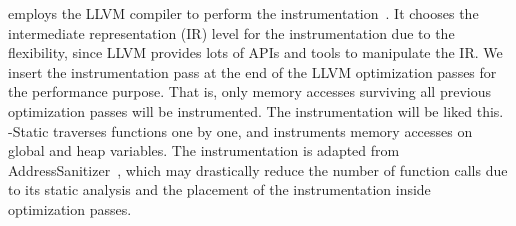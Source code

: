 \NP{} employs the LLVM compiler to perform the instrumentation~\cite{llvm}. It chooses the intermediate  representation (IR) level for the instrumentation due to the flexibility, since LLVM provides lots of APIs and tools to manipulate the IR. We insert the instrumentation pass at the end of the LLVM optimization passes for the performance purpose. That is, only memory accesses surviving all previous optimization passes will be instrumented.  The instrumentation will be liked this. \NP{}-Static traverses functions one by one, and instruments memory accesses on global and heap variables. The instrumentation is adapted from AddressSanitizer~\cite{AddressSanitizer}, which may drastically reduce the  number  of  function  calls due to its static analysis and the placement of the instrumentation inside optimization passes. 

\begin{comment}

To intercept memory access instructions, The function call is implemented by \NP{}, through which \NP{} could intercept each memory access operation from target applications with its address and access type(read or write).

It is worth to note that \NP{} only focused on memory access to heap objects and global objects, since they have much higher chance to be shared for multiple threads, which leads potential NUMA issues. If an object is only accessed by one single thread, it will never cause performance issues, unless threads migrated to another nodes and \NP{} could also detect this problem that is detailed described in the following parts.Besides, the pass function should be placed at the very end of compiling optimization phase of LLVM, since most memory access instructions will be optimized out after huge amounts of compiling optimization strategies applied by LLVM. Based on our experiments, the number of memory access instructions could be reduce by half or more.So if the order of the pass function is not set properly, huge amounts of duplicated instrumentation calls will be made which not only brings more overheads but also makes the profiling results not accurate.

\end{comment}



